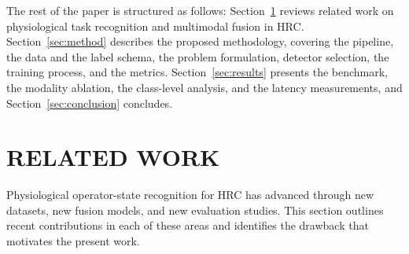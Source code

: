 \documentclass[a4paper,twoside]{article}
\begin{document}

The rest of the paper is structured as follows: Section~\ref{sec:related} reviews related work on physiological task recognition and multimodal fusion in \ac{HRC}. Section~\ref{sec:method} describes the proposed methodology, covering the pipeline, the data and the label schema, the problem formulation, detector selection, the training process, and the metrics. Section~\ref{sec:results} presents the benchmark, the modality ablation, the class-level analysis, and the latency measurements, and Section~\ref{sec:conclusion} concludes.

\section{\uppercase{Related Work}}\label{sec:related}

\noindent Physiological operator-state recognition for \ac{HRC} has advanced through new datasets, new fusion models, and new evaluation studies. This section outlines recent contributions in each of these areas and identifies the drawback that motivates the present work.
\end{document}

